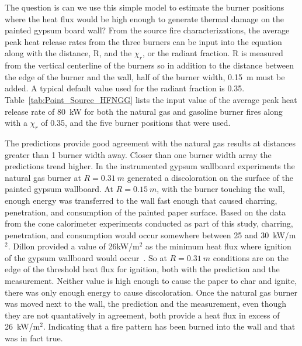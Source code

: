 \documentclass[twoside]{uocthesis}
\begin{document}
{The question is can we use this simple model to estimate the burner positions where the heat flux would be high enough to generate thermal damage on the painted gypsum board wall?  From the source fire characterizations, the average peak heat release rates from the three burners can be input into the equation along with the distance, R, and the $\chi_r$, or the radiant fraction.  R is measured from the vertical centerline of the burners so in addition to the distance between the edge of the burner and the wall, half of the burner width, 0.15~m must be added.  A typical default value used for the radiant fraction is 0.35.  Table~\ref{tab:Point_Source_HFNGG} lists the input value of the average peak heat release rate of 80~kW for both the natural gas and gasoline burner fires along with a $\chi_r$ of 0.35, and the five burner positions that were used.  

The predictions provide good agreement with the natural gas results at distances greater than 1 burner width away.  Closer than one burner width array the predictions trend higher.  In the instrumented gypsum wallboard experiments the natural gas burner at $R=0.31~m$ generated a discoloration on the surface of the painted gypsum wallboard.  At $R=0.15~m$, with the burner touching the wall, enough energy was transferred to the wall fast enough that caused charring, penetration, and consumption of the painted paper surface.  Based on the data from the cone calorimeter experiments conducted as part of this study, charring, penetration, and consumption would occur somewhere between 25 and 30~kW/m$^2$.  Dillon provided a value of 26kW/m$^2$ as the minimum heat flux where ignition of the gypsum wallboard would occur~\cite{Dillon:1998}. So at $R=0.31~m$ conditions are on the edge of the threshold heat flux for ignition, both with the prediction and the measurement.  Neither value is high enough to cause the paper to char and ignite, there was only enough energy to cause discoloration.  Once the natural gas burner was moved next to the wall, the prediction and the measurement, even though they are not quantatively in agreement, both provide a heat flux in excess of 26~kW/m$^2$.  Indicating that a fire pattern has been burned into the wall and that was in fact true.  

}
\end{document}
